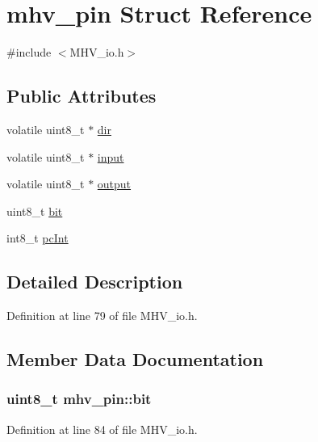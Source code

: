 \hypertarget{structmhv__pin}{
\section{mhv\-\_\-pin \-Struct \-Reference}
\label{structmhv__pin}
}


{\ttfamily \#include $<$\-M\-H\-V\-\_\-io.\-h$>$}

\subsection*{\-Public \-Attributes}
\begin{DoxyCompactItemize}
\item 
volatile uint8\-\_\-t $\ast$ \hyperlink{structmhv__pin_af92bee18d70be924e19ce2d2a6a7b14c}{dir}
\item 
volatile uint8\-\_\-t $\ast$ \hyperlink{structmhv__pin_a7c545d8bf340b11c799df9bc2c998076}{input}
\item 
volatile uint8\-\_\-t $\ast$ \hyperlink{structmhv__pin_a5c5f34f91b6586d0603e9568900f8423}{output}
\item 
uint8\-\_\-t \hyperlink{structmhv__pin_a6e630b4b7c21827dd791ba0fd68f5c57}{bit}
\item 
int8\-\_\-t \hyperlink{structmhv__pin_a10252efa71e71a7e0e5ddb1d184c7101}{pc\-Int}
\end{DoxyCompactItemize}


\subsection{\-Detailed \-Description}


\-Definition at line 79 of file \-M\-H\-V\-\_\-io.\-h.



\subsection{\-Member \-Data \-Documentation}
\hypertarget{structmhv__pin_a6e630b4b7c21827dd791ba0fd68f5c57}{
\subsubsection[{bit}]{\setlength{\rightskip}{0pt plus 5cm}uint8\-\_\-t {\bf mhv\-\_\-pin\-::bit}}}
\label{structmhv__pin_a6e630b4b7c21827dd791ba0fd68f5c57}


\-Definition at line 84 of file \-M\-H\-V\-\_\-io.\-h.

